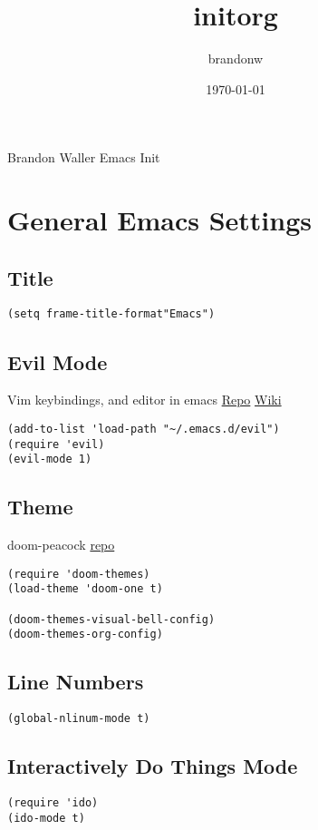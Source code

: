 \documentclass[11pt]{article}
\author{brandonw}
\date{\today}
\title{initorg}
\begin{document}
\maketitle
\tableofcontents

Brandon Waller Emacs Init 

\section{General Emacs Settings}
\label{sec-1}
\subsection{Title}
\label{sec-1-1}
\begin{verbatim}
(setq frame-title-format"Emacs")
\end{verbatim}
\subsection{Evil Mode}
\label{sec-1-2}
Vim keybindings, and editor in emacs
\href{https://github.com/emacs-evil/evil}{Repo}
\href{https://www.emacswiki.org/emacs/Evil}{Wiki}
\begin{verbatim}
(add-to-list 'load-path "~/.emacs.d/evil")
(require 'evil)
(evil-mode 1)
\end{verbatim}

\subsection{Theme}
\label{sec-1-3}
doom-peacock 
\href{https://github.com/hlissner/emacs-doom-themes}{repo}
\begin{verbatim}
(require 'doom-themes)
(load-theme 'doom-one t)

(doom-themes-visual-bell-config)
(doom-themes-org-config)
\end{verbatim}

\subsection{Line Numbers}
\label{sec-1-4}
\begin{verbatim}
(global-nlinum-mode t)
\end{verbatim}
\subsection{Interactively Do Things Mode}
\label{sec-1-5}
\begin{verbatim}
(require 'ido)
(ido-mode t)
\end{verbatim}
\end{document}
